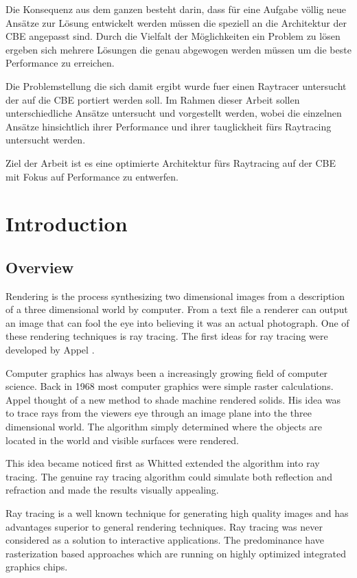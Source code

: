 \documentclass[DIV10, abstracton, openright, footsepline, headsepline, twoside, 9pt,
bigheadings]{scrreprt}
\begin{document}
Die Konsequenz aus dem ganzen besteht darin, dass f\"ur eine Aufgabe v\"ollig neue
Ans\"atze zur L\"osung entwickelt werden m\"ussen die speziell an die Architektur
der CBE angepasst sind. Durch die Vielfalt der M\"oglichkeiten ein
Problem zu l\"osen ergeben sich mehrere L\"osungen die genau abgewogen werden
m\"ussen um die beste Performance zu erreichen.

Die Problemstellung die sich damit ergibt wurde fuer einen Raytracer untersucht der auf die CBE portiert werden soll. Im Rahmen dieser Arbeit sollen unterschiedliche
Ans\"atze untersucht und vorgestellt werden, wobei die einzelnen Ans\"atze hinsichtlich ihrer Performance und ihrer tauglickheit f\"urs Raytracing untersucht werden.

Ziel der Arbeit ist es eine optimierte Architektur f\"urs Raytracing auf der CBE mit Fokus auf Performance zu entwerfen.

\tableofcontents
\listoftables
\listoffigures
\lstlistoflistings

\chapter{Introduction}
\section{Overview}
Rendering is the process synthesizing two dimensional images
from a description of a three dimensional world by computer. From a text
file a renderer
can output an image that can fool the eye into believing it was an actual
photograph.
One of these rendering techniques is ray tracing. The first ideas for ray
tracing were developed by Appel \cite{Appel68}.

Computer graphics has always been a increasingly growing field of computer
science. Back in 1968 most computer graphics were simple raster calculations.
Appel thought of a new method to shade machine rendered solids. His idea was to
trace rays from the viewers eye through an image plane into the three
dimensional world. The algorithm simply determined where the objects are located
in the world and visible surfaces were rendered.

This idea became noticed first as Whitted \cite{Whitted80} extended the
algorithm into ray tracing. The genuine ray tracing algorithm could simulate
both reflection and refraction and made the results visually appealing.

Ray tracing is a well known technique for generating high quality images and has
advantages superior to general rendering techniques. Ray tracing was never
considered as a solution to interactive applications. The pre\-dominance have
rasterization based approaches which are running on highly optimized integrated
graphics chips.
\end{document}
